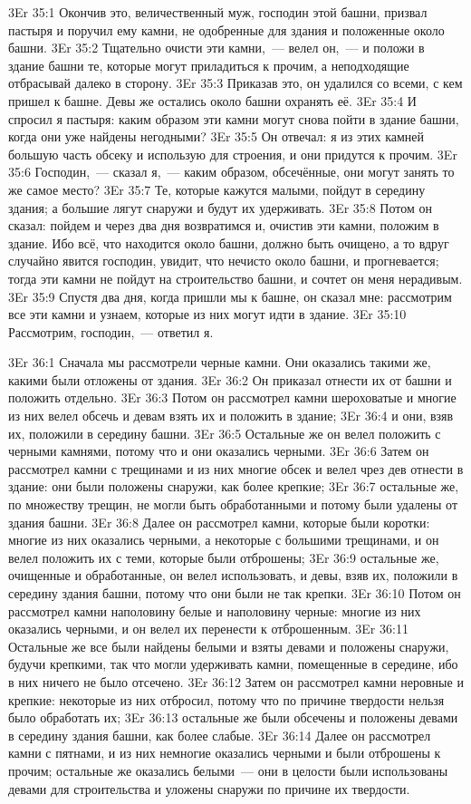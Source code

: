 \vs 3Er 35:1
Окончив это,
величественный муж, господин этой башни, призвал пастыря и поручил ему камни,
не одобренные для здания и положенные около башни.
\vs 3Er 35:2
Тщательно очисти эти
камни,~--- велел он,~--- и положи в здание башни те, которые могут приладиться к
прочим, а неподходящие отбрасывай далеко в сторону.
\vs 3Er 35:3
Приказав это, он удалился
со всеми, с кем пришел к башне. Девы же остались около башни охранять её.
\vs 3Er 35:4
И спросил я пастыря: каким
образом эти камни могут снова пойти в здание башни, когда они уже найдены
негодными?
\vs 3Er 35:5
Он отвечал: я из этих
камней большую часть обсеку и использую для строения, и они придутся к прочим.
\vs 3Er 35:6
Господин,~--- сказал я,~--- каким образом, обсечённые, они могут занять то же самое место?
\vs 3Er 35:7
Те, которые кажутся
малыми, пойдут в середину здания; а большие лягут снаружи и будут их
удерживать.
\vs 3Er 35:8
Потом он сказал: пойдем и
через два дня возвратимся и, очистив эти камни, положим в здание. Ибо всё, что
находится около башни, должно быть очищено, а то вдруг случайно явится
господин, увидит, что нечисто около башни, и прогневается; тогда эти камни не
пойдут на строительство башни, и сочтет он меня нерадивым.
\vs 3Er 35:9
Спустя два дня, когда
пришли мы к башне, он сказал мне: рассмотрим все эти камни и узнаем, которые
из них могут идти в здание.
\vs 3Er 35:10
Рассмотрим, господин,~--- ответил я.

\vs 3Er 36:1
Сначала мы рассмотрели
черные камни. Они оказались такими же, какими были отложены от здания.
\vs 3Er 36:2
Он приказал отнести их от
башни и положить отдельно.
\vs 3Er 36:3
Потом он рассмотрел камни
шероховатые и многие из них велел обсечь и девам взять их и положить в здание;
\vs 3Er 36:4
и они, взяв их, положили в
середину башни.
\vs 3Er 36:5
Остальные же он велел
положить с черными камнями, потому что и они оказались черными.
\vs 3Er 36:6
Затем он рассмотрел камни
с трещинами и из них многие обсек и велел чрез дев отнести в здание: они были
положены снаружи, как более крепкие;
\vs 3Er 36:7
остальные же, по множеству
трещин, не могли быть обработанными и потому были удалены от здания башни.
\vs 3Er 36:8
Далее он рассмотрел камни,
которые были коротки: многие из них оказались черными, а некоторые с большими
трещинами, и он велел положить их с теми, которые были отброшены;
\vs 3Er 36:9
остальные же, очищенные и
обработанные, он велел использовать, и девы, взяв их, положили в середину
здания башни, потому что они были не так крепки.
\vs 3Er 36:10
Потом он рассмотрел камни
наполовину белые и наполовину черные: многие из них оказались черными, и он
велел их перенести к отброшенным.
\vs 3Er 36:11
Остальные же все были
найдены белыми и взяты девами и положены снаружи, будучи крепкими, так что
могли удерживать камни, помещенные в середине, ибо в них ничего не было
отсечено.
\vs 3Er 36:12
Затем он рассмотрел камни
неровные и крепкие: некоторые из них отбросил, потому что по причине твердости
нельзя было обработать их;
\vs 3Er 36:13
остальные же были
обсечены и положены девами в середину здания башни, как более слабые.
\vs 3Er 36:14
Далее он рассмотрел камни
с пятнами, и из них немногие оказались черными и были отброшены к прочим;
остальные же оказались белыми~--- они в целости были использованы девами для
строительства и уложены снаружи по причине их твердости.

